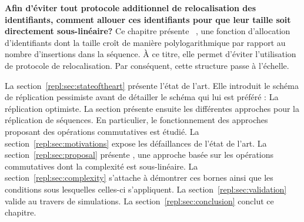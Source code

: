 \textbf{Afin d'éviter tout protocole additionnel de relocalisation des
identifiants, comment allouer ces identifiants pour que leur taille soit
directement sous-linéaire?} Ce chapitre présente
\LSEQ~\cite{nedelec2013concurrency, nedelec2013lseq}, une fonction d'allocation
d'identifiants dont la taille croît de manière polylogarithmique par rapport au
nombre d'insertions dans la séquence. À ce titre, elle permet d'éviter
l'utilisation de protocole de relocalisation. Par conséquent, cette structure
passe à l'échelle.

La section~\ref{repl:sec:stateoftheart} présente l'état de l'art. Elle introduit
le schéma de réplication pessimiste avant de détailler le schéma qui lui est
préféré : La réplication optimiste. La section présente ensuite les différentes
approches pour la réplication de séquences. En particulier, le fonctionnement
des approches proposant des opérations commutatives est étudié. La
section~\ref{repl:sec:motivations} expose les défaillances de l'état de
l'art. La section~\ref{repl:sec:proposal} présente \LSEQ, une approche basée sur
les opérations commutatives dont la complexité est sous-linéaire. La
section~\ref{repl:sec:complexity} s'attache à démontrer ces bornes ainsi que les
conditions sous lesquelles celles-ci s'appliquent. La
section~\ref{repl:sec:validation} valide \LSEQ au travers de simulations. La
section~\ref{repl:sec:conclusion} conclut ce chapitre.


